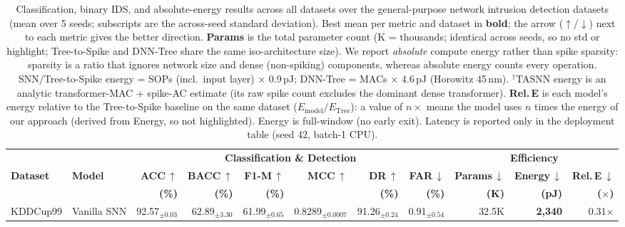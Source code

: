 \begin{table}[!ht]
\centering
\renewcommand{\arraystretch}{1.1}
\caption{Classification, binary IDS, and absolute-energy results across all datasets over the general-purpose network intrusion detection datasets (mean over 5 seeds; subscripts are the across-seed standard deviation). Best mean per metric and dataset in \colorbox{bestcell}{\textbf{bold}}; the arrow ($\uparrow$/$\downarrow$) next to each metric gives the better direction. \textbf{Params} is the total parameter count (K = thousands; identical across seeds, so no std or highlight; Tree-to-Spike and DNN-Tree share the same iso-architecture size). We report \emph{absolute} compute energy rather than spike sparsity: sparsity is a ratio that ignores network size and dense (non-spiking) components, whereas absolute energy counts every operation. SNN/Tree-to-Spike energy = SOPs (incl.\ input layer) $\times$ 0.9\,pJ; DNN-Tree = MACs $\times$ 4.6\,pJ (Horowitz 45\,nm). $^\dagger$TASNN energy is an analytic transformer-MAC + spike-AC estimate (its raw spike count excludes the dominant dense transformer). \textbf{Rel.\,E} is each model's energy relative to the Tree-to-Spike baseline on the same dataset ($E_{\mathrm{model}}/E_{\mathrm{Tree}}$): a value of $n\times$ means the model uses $n$ times the energy of our approach (derived from Energy, so not highlighted). Energy is full-window (no early exit). Latency is reported only in the deployment table (seed 42, batch-1 CPU).}
\label{tab:results_general}
{\scriptsize
\begin{tabular}{l l r r r r r r r r r}
\toprule
& & \multicolumn{6}{c}{\textbf{Classification \& Detection}} & \multicolumn{3}{c}{\textbf{Efficiency}} \\
\cmidrule(lr){3-8} \cmidrule(lr){9-11}
\textbf{Dataset} & \textbf{Model} & \textbf{ACC}\,$\uparrow$ & \textbf{BACC}\,$\uparrow$ & \textbf{F1-M}\,$\uparrow$ & \textbf{MCC}\,$\uparrow$ & \textbf{DR}\,$\uparrow$ & \textbf{FAR}\,$\downarrow$ & \textbf{Params}\,$\downarrow$ & \textbf{Energy}\,$\downarrow$ & \textbf{Rel.\,E}\,$\downarrow$ \\
& & \textbf{(\%)} & \textbf{(\%)} & \textbf{(\%)} & & \textbf{(\%)} & \textbf{(\%)} & \textbf{(K)} & \textbf{(pJ)} & \textbf{($\times$)} \\
\midrule
\multirow{4}{*}{KDDCup99}
& Vanilla SNN   & 92.57$_{\pm0.03}$ & 62.89$_{\pm3.30}$ & 61.99$_{\pm0.65}$ & 0.8289$_{\pm0.0007}$ & 91.26$_{\pm0.24}$ & 0.91$_{\pm0.54}$ & 32.5K & \cellcolor{bestcell}\textbf{2,340} & 0.31$\times$ \\

\end{tabular}}
\end{table}
